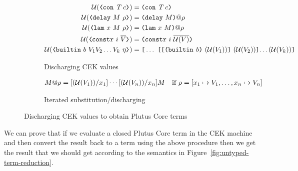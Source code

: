 \begin{figure}[H]
  \centering
  
  \begin{subfigure}[b]{\textwidth}
    \begin{align*}
      \unload{\VCon{\tn}{c}} &= \con{\tn}{c}\\
      \unload{\VDelay{M}{\rho}}
        &= \Unload{\rho}{\delay{M}}\\
      \unload{\VLamAbs{x}{M}{\rho}} &= \Unload{\rho}{\lamU{x}{M}}\\
      \unload{\VConstr{i}{\repetition{V}}} &= \constr{i}{\repetition{\unload{V}}}\\
      \unload{\VBuiltin{b}{V_1 V_2\ldots V_k}{\eta}} &=
      \appU{\ldots}  %
           {\appU
             {\appU
               {\builtin{b}}
               {(\unload{V_1})}
             }
             {(\unload{V_2})}
             {\ldots (\unload{V_k})}
           }
    \end{align*}
    \caption{Discharging CEK values}
    \label{fig:discharge-val}
  \end{subfigure}
  
  \begin{subfigure}[c]{\textwidth}
    \begin{align*}
      {M}@{\rho} &= [(\mathcal{U}(V_1))/x_1]\cdots[(\mathcal{U}(V_n))/x_n]M \quad
      \text{if $\rho = [x_1 \mapsto V_1, \ldots, x_n \mapsto V_n]$}
    \end{align*}
    \caption{Iterated substitution/discharging}
    \label{fig:discharge-env}
  \end{subfigure}
  
  \caption{Discharging CEK values to obtain Plutus Core terms}
  \label{fig:discharge-cek-val}
\end{figure}%
%

\noindent We can prove that if we evaluate a closed Plutus Core term in the CEK
machine and then convert the result back to a term using the above procedure
then we get the result that we should get according to the semantics in
Figure~\ref{fig:untyped-term-reduction}.
